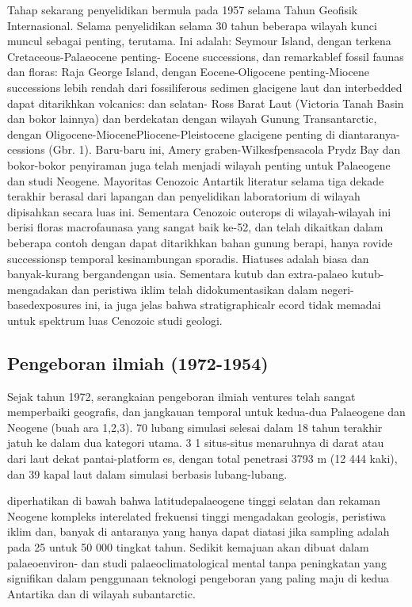		Tahap sekarang penyelidikan bermula pada 1957 selama Tahun Geofisik Internasional. Selama penyelidikan selama 30 tahun beberapa wilayah kunci 
	muncul sebagai penting, terutama. Ini adalah: Seymour Island, dengan terkena Cretaceous-Palaeocene penting- Eocene successions, dan remarkablef 
	fossil faunas dan floras: Raja George Island, dengan Eocene-Oligocene penting-Miocene successions lebih rendah dari fossiliferous sedimen glacigene 
	laut dan interbedded dapat ditarikhkan volcanics: dan selatan- Ross Barat Laut (Victoria Tanah Basin dan bokor lainnya) dan berdekatan dengan wilayah 
	Gunung Transantarctic, dengan Oligocene-MiocenePliocene-Pleistocene glacigene penting di diantaranya- cessions (Gbr. 1). 
	Baru-baru ini, Amery graben-Wilkesfpensacola Prydz Bay dan bokor-bokor penyiraman juga telah menjadi wilayah penting untuk Palaeogene dan studi Neogene. 
	Mayoritas Cenozoic Antartik literatur selama tiga dekade terakhir berasal dari lapangan dan penyelidikan laboratorium di wilayah dipisahkan secara luas ini.
	Sementara Cenozoic outcrops di wilayah-wilayah ini berisi floras macrofaunasa yang sangat baik ke-52, dan telah dikaitkan dalam beberapa contoh dengan 
	dapat ditarikhkan bahan gunung berapi, hanya rovide successionsp temporal kesinambungan sporadis. Hiatuses adalah biasa dan banyak-kurang bergandengan usia. 
	Sementara kutub dan extra-palaeo kutub-mengadakan dan peristiwa iklim telah didokumentasikan dalam negeri-basedexposures ini, 
	ia juga jelas bahwa stratigraphicalr ecord tidak memadai untuk spektrum luas Cenozoic studi geologi.
	
	
\subsection{Pengeboran ilmiah (1972-1954)}

		Sejak tahun 1972, serangkaian pengeboran ilmiah ventures telah sangat memperbaiki geografis, dan jangkauan temporal untuk kedua-dua Palaeogene 
	dan Neogene (buah ara 1,2,3). 70 lubang simulasi selesai dalam 18 tahun terakhir jatuh ke dalam dua kategori utama. 3 1 situs-situs menaruhnya di darat 
	atau dari laut dekat pantai-platform es, dengan total penetrasi 3793 m (12 444 kaki), dan 39 kapal laut dalam simulasi berbasis lubang-lubang.
	
	diperhatikan di bawah bahwa latitudepalaeogene tinggi selatan dan rekaman Neogene kompleks interelated frekuensi tinggi mengadakan geologis, 
	peristiwa iklim dan, banyak di antaranya yang hanya dapat diatasi jika sampling adalah pada 25 untuk 50 000 tingkat tahun. Sedikit kemajuan akan dibuat 
	dalam palaeoenviron- dan studi palaeoclimatological mental tanpa peningkatan yang signifikan dalam penggunaan teknologi pengeboran yang paling maju 
	di kedua Antartika dan di wilayah subantarctic.
	

